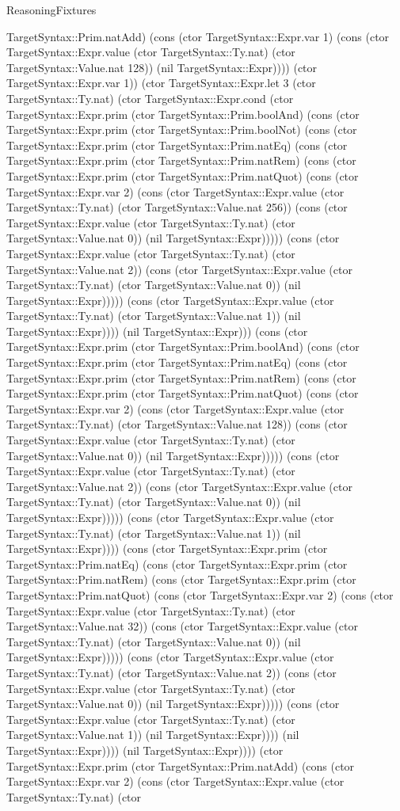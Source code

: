 \begin{lexlean}{ReasoningFixtures}
\begin{semanticmodule}
{TargetSyntax::Prim.natAdd) (cons (ctor TargetSyntax::Expr.var 1) (cons (ctor TargetSyntax::Expr.value (ctor TargetSyntax::Ty.nat) (ctor TargetSyntax::Value.nat 128)) (nil TargetSyntax::Expr)))) (ctor TargetSyntax::Expr.var 1)) (ctor TargetSyntax::Expr.let 3 (ctor TargetSyntax::Ty.nat) (ctor TargetSyntax::Expr.cond (ctor TargetSyntax::Expr.prim (ctor TargetSyntax::Prim.boolAnd) (cons (ctor TargetSyntax::Expr.prim (ctor TargetSyntax::Prim.boolNot) (cons (ctor TargetSyntax::Expr.prim (ctor TargetSyntax::Prim.natEq) (cons (ctor TargetSyntax::Expr.prim (ctor TargetSyntax::Prim.natRem) (cons (ctor TargetSyntax::Expr.prim (ctor TargetSyntax::Prim.natQuot) (cons (ctor TargetSyntax::Expr.var 2) (cons (ctor TargetSyntax::Expr.value (ctor TargetSyntax::Ty.nat) (ctor TargetSyntax::Value.nat 256)) (cons (ctor TargetSyntax::Expr.value (ctor TargetSyntax::Ty.nat) (ctor TargetSyntax::Value.nat 0)) (nil TargetSyntax::Expr))))) (cons (ctor TargetSyntax::Expr.value (ctor TargetSyntax::Ty.nat) (ctor TargetSyntax::Value.nat 2)) (cons (ctor TargetSyntax::Expr.value (ctor TargetSyntax::Ty.nat) (ctor TargetSyntax::Value.nat 0)) (nil TargetSyntax::Expr))))) (cons (ctor TargetSyntax::Expr.value (ctor TargetSyntax::Ty.nat) (ctor TargetSyntax::Value.nat 1)) (nil TargetSyntax::Expr)))) (nil TargetSyntax::Expr))) (cons (ctor TargetSyntax::Expr.prim (ctor TargetSyntax::Prim.boolAnd) (cons (ctor TargetSyntax::Expr.prim (ctor TargetSyntax::Prim.natEq) (cons (ctor TargetSyntax::Expr.prim (ctor TargetSyntax::Prim.natRem) (cons (ctor TargetSyntax::Expr.prim (ctor TargetSyntax::Prim.natQuot) (cons (ctor TargetSyntax::Expr.var 2) (cons (ctor TargetSyntax::Expr.value (ctor TargetSyntax::Ty.nat) (ctor TargetSyntax::Value.nat 128)) (cons (ctor TargetSyntax::Expr.value (ctor TargetSyntax::Ty.nat) (ctor TargetSyntax::Value.nat 0)) (nil TargetSyntax::Expr))))) (cons (ctor TargetSyntax::Expr.value (ctor TargetSyntax::Ty.nat) (ctor TargetSyntax::Value.nat 2)) (cons (ctor TargetSyntax::Expr.value (ctor TargetSyntax::Ty.nat) (ctor TargetSyntax::Value.nat 0)) (nil TargetSyntax::Expr))))) (cons (ctor TargetSyntax::Expr.value (ctor TargetSyntax::Ty.nat) (ctor TargetSyntax::Value.nat 1)) (nil TargetSyntax::Expr)))) (cons (ctor TargetSyntax::Expr.prim (ctor TargetSyntax::Prim.natEq) (cons (ctor TargetSyntax::Expr.prim (ctor TargetSyntax::Prim.natRem) (cons (ctor TargetSyntax::Expr.prim (ctor TargetSyntax::Prim.natQuot) (cons (ctor TargetSyntax::Expr.var 2) (cons (ctor TargetSyntax::Expr.value (ctor TargetSyntax::Ty.nat) (ctor TargetSyntax::Value.nat 32)) (cons (ctor TargetSyntax::Expr.value (ctor TargetSyntax::Ty.nat) (ctor TargetSyntax::Value.nat 0)) (nil TargetSyntax::Expr))))) (cons (ctor TargetSyntax::Expr.value (ctor TargetSyntax::Ty.nat) (ctor TargetSyntax::Value.nat 2)) (cons (ctor TargetSyntax::Expr.value (ctor TargetSyntax::Ty.nat) (ctor TargetSyntax::Value.nat 0)) (nil TargetSyntax::Expr))))) (cons (ctor TargetSyntax::Expr.value (ctor TargetSyntax::Ty.nat) (ctor TargetSyntax::Value.nat 1)) (nil TargetSyntax::Expr)))) (nil TargetSyntax::Expr)))) (nil TargetSyntax::Expr)))) (ctor TargetSyntax::Expr.prim (ctor TargetSyntax::Prim.natAdd) (cons (ctor TargetSyntax::Expr.var 2) (cons (ctor TargetSyntax::Expr.value (ctor TargetSyntax::Ty.nat) (ctor }
\end{semanticmodule}
\end{lexlean}
